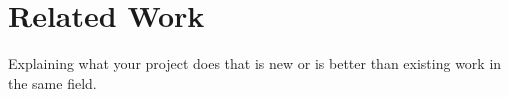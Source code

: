 \chapter{Related Work}

Explaining what your project does that is new or is better than existing work in the same field.